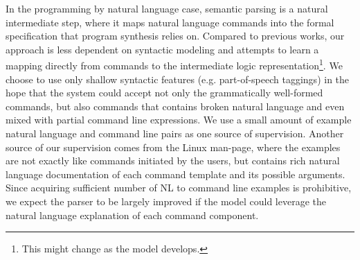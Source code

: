 In the programming by natural language case, semantic parsing is a natural intermediate step, where it maps natural language commands into the formal specification that program synthesis relies on. Compared to previous works, our approach is less dependent on syntactic modeling and attempts to learn a mapping directly from commands to the intermediate logic representation\footnote{This might change as the model develops.}. We choose to use only shallow syntactic features (e.g. part-of-speech taggings) in the hope that the system could accept not only the grammatically well-formed commands, but also commands that contains broken natural language and even mixed with partial command line expressions. We use a small amount of example natural language and command line pairs as one source of supervision. Another source of our supervision comes from the Linux man-page, where the examples are not exactly like commands initiated by the users, but contains rich natural language documentation of each command template and its possible arguments. Since acquiring sufficient number of NL to command line examples is prohibitive, we expect the parser to be largely improved if the model could leverage the natural language explanation of each command component.
